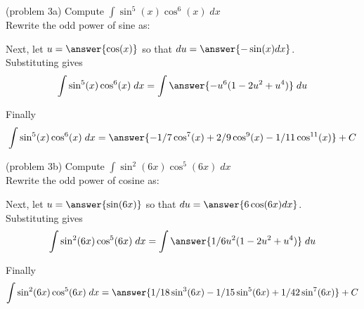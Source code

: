 \documentclass[handout]{ximera}
\begin{document}
\begin{problem}(problem 3a) 
Compute $\displaystyle{\int \sin^5(x)\cos^6(x) \; dx}$\\

Rewrite the odd power of sine as:

\begin{multipleChoice}
\end{multipleChoice}

Next, let $u = \answer{\cos(x)}$ so that $du = \answer{-\sin(x) dx}$.\\

Substituting gives
\[
\int \sin^5(x)\cos^6(x) \; dx= \int \answer{-u^6(1-2u^2 + u^4)} \; du
\]

Finally
\[
\int \sin^5(x)\cos^6(x) \; dx= \answer{-1/7 \cos^7(x) + 2/9 \cos^9(x) - 1/11 \cos^{11}(x)} + C
\]

\end{problem}



\begin{problem}{\color{gray}(problem 3b)} 
Compute $\displaystyle{\int \sin^2(6x)\cos^5(6x) \; dx}$\\

Rewrite the odd power of cosine as:

\begin{multipleChoice}
\end{multipleChoice}

Next, let $u = \answer{\sin(6x)}$ so that $du = \answer{6 \cos(6x) dx}$.\\

Substituting gives
\[
\int \sin^2(6x)\cos^5(6x) \; dx= \int \answer{1/6 u^2(1-2u^2 + u^4)} \; du
\]

Finally
\[
\int \sin^2(6x)\cos^5(6x) \; dx= \answer{1/18 \sin^3(6x) - 1/15 \sin^5(6x) + 1/42 \sin^7(6x)} + C
\]
\end{problem}
\end{document}
